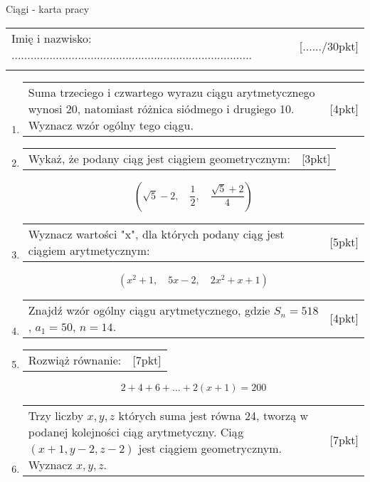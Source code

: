 \documentclass[12pt,a4paper]{article}
\begin{document}
	\begin{center}
		\LARGE Ciągi - karta pracy
	\end{center}
	\vspace{1.5cm}
	\begin{tabular}{p{13cm} r}
		Imię i nazwisko: ............................................................................
		&[....../30pkt]\\ 
		\vspace{0.5cm}
	\end{tabular}
	\begin{enumerate}[1.]
		\item  \begin{tabular}{p{13cm} r}
			Suma trzeciego i czwartego wyrazu ciągu arytmetycznego wynosi 20, natomiast różnica siódmego i drugiego 10. Wyznacz wzór ogólny tego ciągu. &[4pkt]\\ 
		\end{tabular}
	
	\item  \begin{tabular}{p{13cm} r}
		Wykaż, że podany ciąg jest ciągiem geometrycznym: &[3pkt]\\ 
	\end{tabular}
	$$(\sqrt{5}-2, \quad \frac{1}{2}, \quad \frac{\sqrt{5}+2}{4})$$
	\item  \begin{tabular}{p{13cm} r}
		Wyznacz wartości "x", dla których podany ciąg jest ciągiem arytmetycznym: &[5pkt]\\ 
	\end{tabular}
		$$(x^2+1,\quad 5x-2, \quad 2x^2+x+1)$$
		
		\item  \begin{tabular}{p{13cm} r}
			Znajdź wzór ogólny ciągu arytmetycznego, gdzie $S_n=518$, $a_1=50$, $n=14$. &[4pkt]\\ 
		\end{tabular}
	
	\item  \begin{tabular}{p{13cm} r}
		Rozwiąż równanie: &[7pkt]\\ 
	\end{tabular}

	$$2+4+6+\dots + 2(x+1) = 200$$
	
	\item  \begin{tabular}{p{13cm} r}
		Trzy liczby $x,y,z$ których suma jest równa 24, tworzą w podanej kolejności ciąg arytmetyczny. Ciąg $(x+1,y-2,z-2)$ jest ciągiem geometrycznym. Wyznacz $x,y,z$. &[7pkt]\\ 
	\end{tabular}

	\end{enumerate}
	
\end{document}

